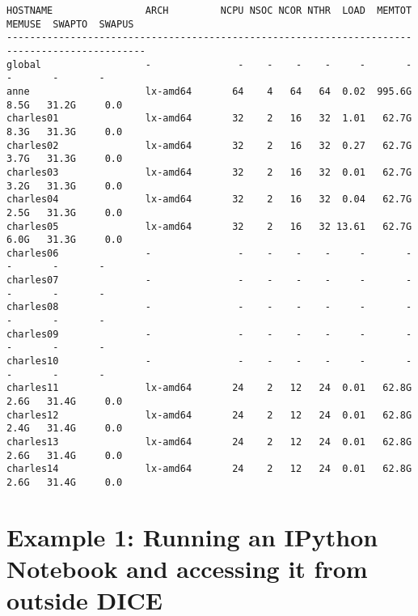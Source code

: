 \documentclass[]{article}
\begin{document}
\begin{verbatim}
HOSTNAME                ARCH         NCPU NSOC NCOR NTHR  LOAD  MEMTOT  MEMUSE  SWAPTO  SWAPUS
----------------------------------------------------------------------------------------------
global                  -               -    -    -    -     -       -       -       -       -
anne                    lx-amd64       64    4   64   64  0.02  995.6G    8.5G   31.2G     0.0
charles01               lx-amd64       32    2   16   32  1.01   62.7G    8.3G   31.3G     0.0
charles02               lx-amd64       32    2   16   32  0.27   62.7G    3.7G   31.3G     0.0
charles03               lx-amd64       32    2   16   32  0.01   62.7G    3.2G   31.3G     0.0
charles04               lx-amd64       32    2   16   32  0.04   62.7G    2.5G   31.3G     0.0
charles05               lx-amd64       32    2   16   32 13.61   62.7G    6.0G   31.3G     0.0
charles06               -               -    -    -    -     -       -       -       -       -
charles07               -               -    -    -    -     -       -       -       -       -
charles08               -               -    -    -    -     -       -       -       -       -
charles09               -               -    -    -    -     -       -       -       -       -
charles10               -               -    -    -    -     -       -       -       -       -
charles11               lx-amd64       24    2   12   24  0.01   62.8G    2.6G   31.4G     0.0
charles12               lx-amd64       24    2   12   24  0.01   62.8G    2.4G   31.4G     0.0
charles13               lx-amd64       24    2   12   24  0.01   62.8G    2.6G   31.4G     0.0
charles14               lx-amd64       24    2   12   24  0.01   62.8G    2.6G   31.4G     0.0
\end{verbatim}

\section{Example 1: Running an IPython Notebook and accessing it from
outside
DICE}\label{example-1-running-an-ipython-notebook-and-accessing-it-from-outside-dice}
\end{document}
